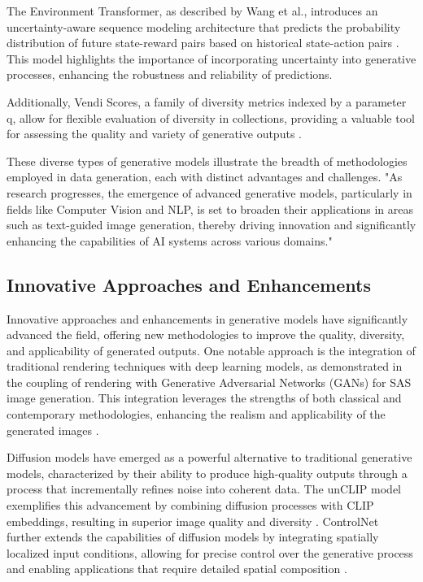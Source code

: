 The Environment Transformer, as described by Wang et al., introduces an uncertainty-aware sequence modeling architecture that predicts the probability distribution of future state-reward pairs based on historical state-action pairs \cite{wang2023environmenttransformerpolicyoptimization}. This model highlights the importance of incorporating uncertainty into generative processes, enhancing the robustness and reliability of predictions.



Additionally, Vendi Scores, a family of diversity metrics indexed by a parameter q, allow for flexible evaluation of diversity in collections, providing a valuable tool for assessing the quality and variety of generative outputs \cite{pasarkar2024cousinsvendiscorefamily}.



These diverse types of generative models illustrate the breadth of methodologies employed in data generation, each with distinct advantages and challenges. "As research progresses, the emergence of advanced generative models, particularly in fields like Computer Vision and NLP, is set to broaden their applications in areas such as text-guided image generation, thereby driving innovation and significantly enhancing the capabilities of AI systems across various domains." \cite{palmini2024patternscreativityuserinput}



\subsection{Innovative Approaches and Enhancements} \label{subsec:Innovative Approaches and Enhancements}



Innovative approaches and enhancements in generative models have significantly advanced the field, offering new methodologies to improve the quality, diversity, and applicability of generated outputs. One notable approach is the integration of traditional rendering techniques with deep learning models, as demonstrated in the coupling of rendering with Generative Adversarial Networks (GANs) for SAS image generation. This integration leverages the strengths of both classical and contemporary methodologies, enhancing the realism and applicability of the generated images \cite{reed2019couplingrenderinggenerativeadversarial}.



Diffusion models have emerged as a powerful alternative to traditional generative models, characterized by their ability to produce high-quality outputs through a process that incrementally refines noise into coherent data. The unCLIP model exemplifies this advancement by combining diffusion processes with CLIP embeddings, resulting in superior image quality and diversity \cite{dhariwal2021diffusion}. ControlNet further extends the capabilities of diffusion models by integrating spatially localized input conditions, allowing for precise control over the generative process and enabling applications that require detailed spatial composition \cite{zhang2023adding}.



